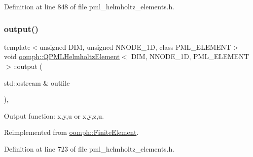 Definition at line 848 of file pml\+\_\+helmholtz\+\_\+elements.\+h.

\mbox{\label{classoomph_1_1QPMLHelmholtzElement_af05911b64893f693f25097dffa6a4955}} 
\subsubsection{\texorpdfstring{output()}{output()}\hspace{0.1cm}{\footnotesize\ttfamily [1/4]}}
{\footnotesize\ttfamily template$<$unsigned D\+IM, unsigned N\+N\+O\+D\+E\+\_\+1D, class P\+M\+L\+\_\+\+E\+L\+E\+M\+E\+NT$>$ \\
void \hyperlink{classoomph_1_1QPMLHelmholtzElement}{oomph\+::\+Q\+P\+M\+L\+Helmholtz\+Element}$<$ D\+IM, N\+N\+O\+D\+E\+\_\+1D, P\+M\+L\+\_\+\+E\+L\+E\+M\+E\+NT $>$\+::output (\begin{DoxyParamCaption}\item[{std\+::ostream \&}]{outfile }\end{DoxyParamCaption})\hspace{0.3cm}{\ttfamily [inline]}, {\ttfamily [virtual]}}



Output function\+: x,y,u or x,y,z,u. 



Reimplemented from \hyperlink{classoomph_1_1FiniteElement_a2ad98a3d2ef4999f1bef62c0ff13f2a7}{oomph\+::\+Finite\+Element}.



Definition at line 723 of file pml\+\_\+helmholtz\+\_\+elements.\+h.

\mbox{\label{classoomph_1_1QPMLHelmholtzElement_a2a9014358af0d72ff3e06d11286beb84}} 
